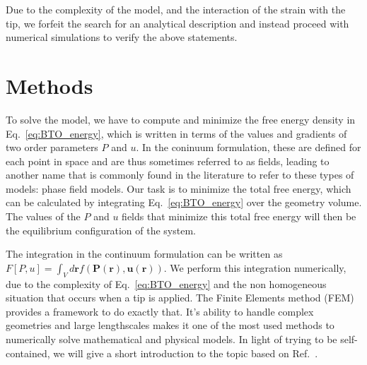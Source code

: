 Due to the complexity of the model, and the interaction of the strain with the tip, we forfeit the search for an analytical description and instead proceed with numerical simulations to verify the above statements.

\section{Methods}
To solve the model, we have to compute and minimize the free energy density in Eq.~\ref{eq:BTO_energy}, which is written in terms of the values and gradients of two order parameters $P$ and $u$.
In the coninuum formulation, these are defined for each point in space and are thus sometimes referred to as fields, leading to another name that is commonly found in the literature to refer to these types of models: phase field models.
Our task is to minimize the total free energy, which can be calculated by integrating Eq.~\ref{eq:BTO_energy} over the geometry volume.
The values of the $P$ and $u$ fields that minimize this total free energy will then be the equilibrium configuration of the system.

The integration in the continuum formulation can be written as $F[P,u]=\int_V d\bm{r} f(\bm{P}(\bm{r}),\bm{u}(\bm{r}))$.
We perform this integration numerically, due to the complexity of Eq.~\ref{eq:BTO_energy} and the non homogeneous situation that occurs when a tip is applied.
The Finite Elements method (FEM) provides a framework to do exactly that.
It's ability to handle complex geometries and large lengthscales makes it one of the most used methods to numerically solve mathematical and physical models.
In light of trying to be self-contained, we will give a short introduction to the topic based on Ref.~\cite{Biner}.

